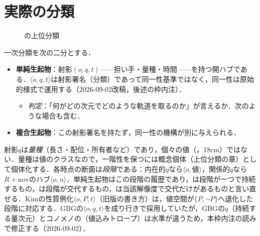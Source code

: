 \documentclass[../../main-detail.tex]{subfiles}
\begin{document}
\section{実際の分類}
\begin{figure}[H]
  \centering
  \caption{の上位分類}
\end{figure}
一次分類を次の二分とする．
\begin{itemize}
    \item \textbf{単純生起物}：射影$(o,q,t)$——担い手・量種・時間——を持つ開ハブである．$\langle o,q,t\rangle$は射影署名（分類）であって同一性基準ではなく，同一性は原始的様式で運用する（2026-09-02改稿，後述の枠内注）．
    \begin{itemize}
        \item \emph{判定}：「何がどの次元でどのような軌道を取るのか」が言えるか．次のような場合も含む．
    \end{itemize}
    \item \textbf{複合生起物}：この射影署名を持たず，同一性の機構が別に与えられる．
\end{itemize}
\begin{leftlinebox}
射影$q$は\emph{量種}（長さ・配位・所有者など）であり，個々の値（，18cm）ではない．量種は値のクラスなので，一階性を保つには概念個体（上位分類の章）として個体化する．各時点の断面は\emph{段階}である：内在的$q$なら$\langle o,\text{値}\rangle$，関係的$q$なら$R+\mathrm{nov}$のハブ$\langle o,n\rangle$．単純生起物はこの段階の履歴であり，は段階が一つで持続するもの，は段階が交代するもの，は当該解像度で交代だけがあるものと言い直せる．Kimの性質例化$\langle o,P,t\rangle$（旧版の書き方）は，値空間が$\{P,\lnot P\}$へ退化した段階に対応する．GBGの$\langle o,q,t\rangle$を成り行きで採用していたが，GBGの$q$（持続する量次元）とコノメノの（値込みトロープ）は水準が違うため，本枠内注の読みで修正する（2026-09-02）．
\end{leftlinebox}
\end{document}
